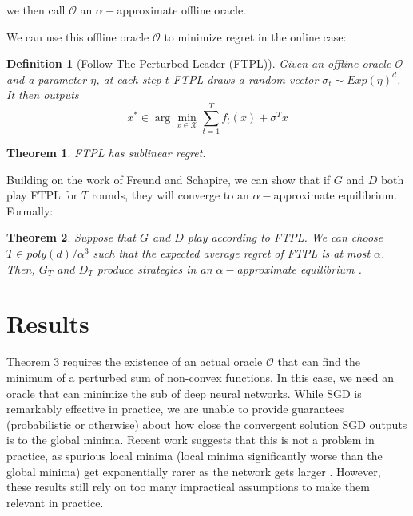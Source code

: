 \documentclass[]{article}
\newcommand{\X}{\mathcal{X}}
\newtheorem{definition}{Definition}
\newtheorem{theorem}{Theorem}
\begin{document}
we then call $\mathcal{O}$ an $\alpha-$approximate offline oracle.


We can use this offline oracle $\mathcal{O}$ to minimize regret in the online case:

\begin{definition}[Follow-The-Perturbed-Leader (FTPL)]
    Given an offline oracle $\mathcal{O}$ and a parameter $\eta$, at each step $t$ FTPL draws a random vector $\sigma_t \sim Exp(\eta)^d$. It then outputs 
    \begin{equation}
        x^* \in \arg\min_{x \in \X} \sum_{t=1}^Tf_t(x) + \sigma^Tx
    \end{equation}
\end{definition}

\begin{theorem}
    FTPL has sublinear regret. \cite{AGH18}
\end{theorem}

Building on the work of Freund and Schapire, we can show that if $G$ and $D$ both play FTPL for $T$ rounds, they will converge to an $\alpha-$approximate equilibrium. Formally:

\begin{theorem}\label{ftpl-equilibriu}
    Suppose that $G$ and $D$ play according to FTPL. We can choose $T \in poly(d)/\alpha^3$ such that the expected average regret of FTPL is at most $\alpha$. Then, $G_T$ and $D_T$ produce strategies in an $\alpha-$approximate equilibrium \cite{AGH18}.
\end{theorem}

\section{Results}

Theorem 3 requires the existence of an actual oracle $\mathcal{O}$ that can find the minimum of a perturbed sum of non-convex functions. In this case, we need an oracle that can minimize the sub of deep neural networks. While SGD is remarkably effective in practice, we are unable to provide guarantees (probabilistic or otherwise) about how close the convergent solution SGD outputs is to the global minima. Recent work suggests that this is not a problem in practice, as spurious local minima (local minima significantly worse than the global minima) get exponentially rarer as the network gets larger \cite{CHM+14}. However, these results still rely on too many impractical assumptions to make them relevant in practice. 
\end{document}
